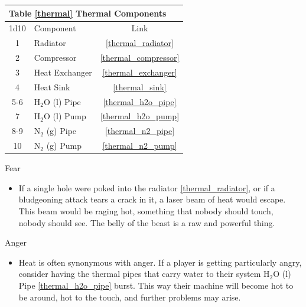 \documentclass[a4paper]{article}
\begin{document}
\vspace{0.5cm} \hspace{0.25\linewidth}
\def\thermal_components{
\begin{tabular}[t]{| c | l | c |}
\toprule
\multicolumn{3}{|l|}{Table \ref{thermal} Thermal Components} \\
\toprule
1d10 & Component & Link \\
\midrule
1 & Radiator & \ref{thermal_radiator} \\
2 & Compressor & \ref{thermal_compressor} \\
3 & Heat Exchanger & \ref{thermal_exchanger} \\
4 & Heat Sink & \ref{thermal_sink} \\
\midrule
5-6 & H$_2$O (l) Pipe & \ref{thermal_h2o_pipe} \\
7 & H$_2$O (l) Pump & \ref{thermal_h2o_pump} \\
8-9 & N$_2$ (g) Pipe & \ref{thermal_n2_pipe} \\
10 & N$_2$ (g) Pump & \ref{thermal_n2_pump} \\
\bottomrule
\end{tabular}
}
\thermal_components

\vspace{0.3cm}
\begin{minipage}[t]{0.4\linewidth}
Fear
\begin{itemize}
\item If a single hole were poked into the radiator \ref{thermal_radiator}, or if a bludgeoning attack tears a crack in it, a laser beam of heat would escape. This beam would be raging hot, something that nobody should touch, nobody should see. The belly of the beast is a raw and powerful thing.
\end{itemize}
\end{minipage} 
\begin{minipage}[t]{0.4\linewidth}
Anger
\begin{itemize}
\item Heat is often synonymous with anger. If a player is getting particularly angry, consider having the thermal pipes that carry water to their system H$_2$O (l) Pipe \ref{thermal_h2o_pipe} burst. This way their machine will become hot to be around, hot to the touch, and further problems may arise. 
\end{itemize}
\end{minipage}
\end{document}
